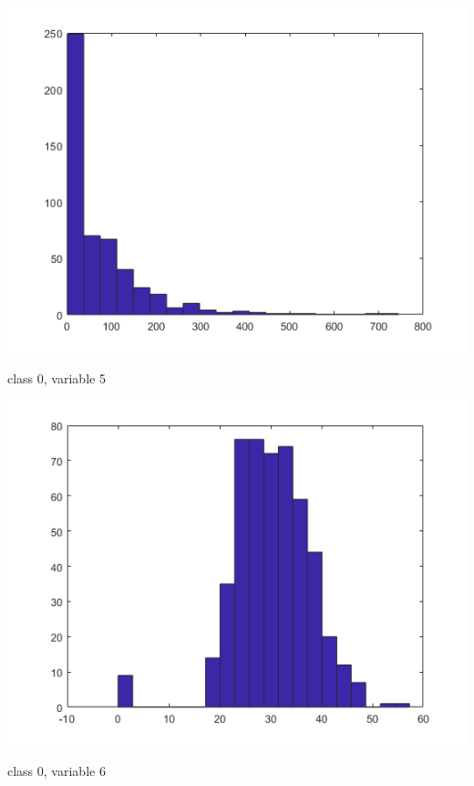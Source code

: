 \documentclass[a4paper]{article}
\begin{document}
\begin{center}
    \includegraphics[scale=1]{0-5.png}
    \caption{class 0, variable 5}
\end{center}

\begin{center}
    \includegraphics[scale=1]{0-6.png}
    \caption{class 0, variable 6}
\end{center}
\end{document}
